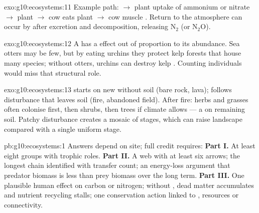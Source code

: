 \begin{solution}{exo:g10:ecosystems:11}
Example path:  $\to$ plant uptake of ammonium or nitrate $\to$
plant  $\to$ cow eats plant $\to$ cow muscle . Return to the
atmosphere can occur by  after excretion and decomposition,
releasing $\mathrm{N_2}$ (or $\mathrm{N_2O}$).
\end{solution}

\begin{solution}{exo:g10:ecosystems:12}
A  has a  effect out of proportion to its abundance.
Sea otters may be few, but by eating urchins they protect kelp forests that
house many species; without otters, urchins can destroy kelp . Counting
individuals would miss that structural role.
\end{solution}

\begin{solution}{exo:g10:ecosystems:13}
 starts on new  without soil (bare rock, lava);
 follows disturbance that leaves soil (fire, abandoned
field). After fire: herbs and grasses often colonise first, then shrubs, then
trees if climate allows --- a   on remaining soil. Patchy
disturbance creates a mosaic of stages, which can raise landscape  compared with a single uniform stage.
\end{solution}

\begin{solution}{pb:g10:ecosystems:1}
Answers depend on site; full credit requires:
\textbf{Part I.} At least eight groups with trophic roles.
\textbf{Part II.} A web with at least six arrows; the longest chain identified
with transfer count; an energy-loss argument that predator biomass is less
than prey biomass over the long term.
\textbf{Part III.} One plausible human effect on carbon or nitrogen; without
, dead matter accumulates and nutrient recycling stalls; one
conservation action linked to , resources or connectivity.
\end{solution}
